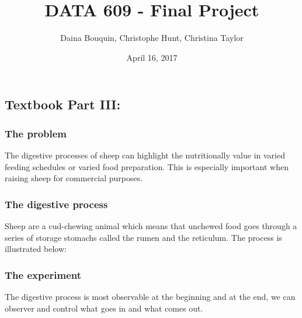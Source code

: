 \documentclass[]{article}
\title{DATA 609 - Final Project}
\author{Daina Bouquin, Christophe Hunt, Christina Taylor}
\date{April 16, 2017}
\begin{document}
\maketitle

{
\setcounter{tocdepth}{2}
\tableofcontents
}
\newpage

\subsection{Textbook Part III:}\label{textbook-part-iii}

\subsubsection{The problem}\label{the-problem}

The digestive processes of sheep can highlight the nutritionally value
in varied feeding schedules or varied food preparation. This is
especially important when raising sheep for commercial purposes.

\subsubsection{The digestive process}\label{the-digestive-process}

Sheep are a cud-chewing animal which means that unchewed food goes
through a series of storage stomachs called the rumen and the reticulum.
The process is illustrated below:


\subsubsection{The experiment}\label{the-experiment}

The digestive process is most observable at the beginning and at the
end, we can observer and control what goes in and what comes out.
\end{document}
